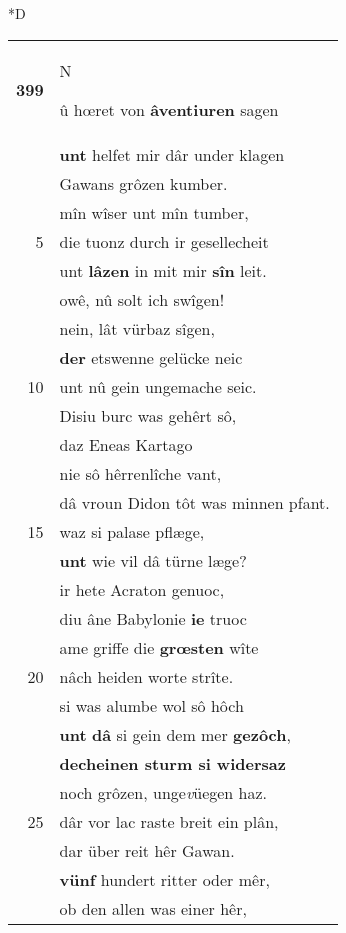 \documentclass[8pt,a4paper,notitlepage]{article}
\begin{document}
\begin{table}[ht]
\begin{minipage}[t]{0.5\linewidth}
\small
\begin{center}*D
\end{center}
\begin{tabular}{rl}
\textbf{399} & \begin{large}N\end{large}û hœret von \textbf{âventiuren} sagen\\ 
 & \textbf{unt} helfet mir dâr under klagen\\ 
 & Gawans grôzen kumber.\\ 
 & mîn wîser unt mîn tumber,\\ 
5 & die tuonz durch ir gesellecheit\\ 
 & unt \textbf{lâzen} in mit mir \textbf{sîn} leit.\\ 
 & owê, nû solt ich swîgen!\\ 
 & nein, lât vürbaz sîgen,\\ 
 & \textbf{der} etswenne gelücke neic\\ 
10 & unt nû gein ungemache seic.\\ 
 & Disiu burc was gehêrt sô,\\ 
 & daz Eneas Kartago\\ 
 & nie sô hêrrenlîche vant,\\ 
 & dâ vroun Didon tôt was minnen pfant.\\ 
15 & waz si palase pflæge,\\ 
 & \textbf{unt} wie vil dâ türne læge?\\ 
 & ir hete Acraton genuoc,\\ 
 & diu âne Babylonie \textbf{ie} truoc\\ 
 & ame griffe die \textbf{grœsten} wîte\\ 
20 & nâch heiden worte strîte.\\ 
 & si was alumbe wol sô hôch\\ 
 & \textbf{unt} \textbf{dâ} si gein dem mer \textbf{gezôch},\\ 
 & \textbf{decheinen sturm si widersaz}\\ 
 & noch grôzen, unge\textit{v}üegen haz.\\ 
25 & dâr vor lac raste breit ein plân,\\ 
 & dar über reit hêr Gawan.\\ 
 & \textbf{vünf} hundert ritter oder mêr,\\ 
 & ob den allen was einer hêr,\\ 

\end{tabular}
\end{minipage}
\end{table}
\end{document}
